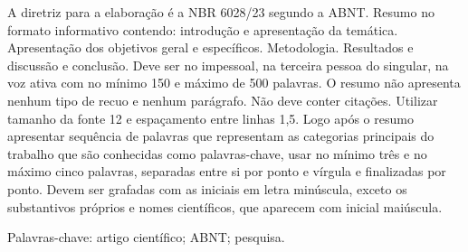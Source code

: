 \setlength{\absparsep}{18pt}
\begin{resumo}
    A diretriz para a elaboração é a NBR 6028/23 segundo a ABNT. Resumo no formato informativo contendo: introdução e apresentação da temática. Apresentação dos objetivos geral e específicos. Metodologia. Resultados e discussão e conclusão. Deve ser no impessoal, na terceira pessoa do singular, na voz ativa com no mínimo 150 e máximo de 500 palavras. O resumo não apresenta nenhum tipo de recuo e nenhum parágrafo. Não deve conter citações. Utilizar tamanho da fonte 12 e espaçamento entre linhas 1,5. Logo após o resumo apresentar sequência de palavras que representam as categorias principais do trabalho que são conhecidas como palavras-chave, usar no mínimo três e no máximo cinco palavras, separadas entre si por ponto e vírgula e finalizadas por ponto. Devem ser grafadas com as iniciais em letra minúscula, exceto os substantivos próprios e nomes científicos, que aparecem com inicial maiúscula.
    
    Palavras-chave: artigo científico; ABNT; pesquisa.
\end{resumo}

